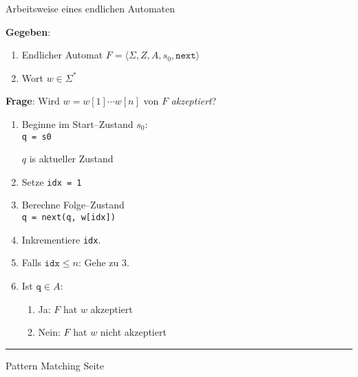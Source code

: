 
\begin{slide}{}
\normalsize

\begin{center}
Arbeitsweise eines endlichen Automaten 
\end{center}
\vspace*{0.5cm}

\footnotesize
\textbf{Gegeben}: 
\begin{enumerate}
\item Endlicher Automat  $F = \langle \Sigma, Z, A, s_0, \mathtt{next}  \rangle$
\item Wort $w \in \Sigma^*$
\end{enumerate}
\textbf{Frage}: Wird $w = w[1] \cdots w[n]$ von $F$ \emph{akzeptiert}?
\begin{enumerate}
\item Beginne im Start--Zustand $s_0$: \\[0.3cm]
      \hspace*{1.3cm} \texttt{q = s0} 

      $q$ is aktueller Zustand
\item Setze \texttt{idx = 1}
\item Berechne Folge--Zustand \\[0.3cm]
      \hspace*{1.3cm} \texttt{q = next(q, w[idx])}
\item Inkrementiere \texttt{idx}.
\item Falls $\texttt{idx} \leq n$: Gehe zu 3.
\item Ist $\texttt{q} \in A$:
  \begin{enumerate}
  \item Ja: $F$ hat $w$ akzeptiert
  \item Nein: $F$ hat $w$ nicht akzeptiert
  \end{enumerate}
\end{enumerate}


\vspace*{\fill}
\tiny \addtocounter{mypage}{1}
\rule{17cm}{1mm}
Pattern Matching \hspace*{\fill} Seite 
\end{slide}



